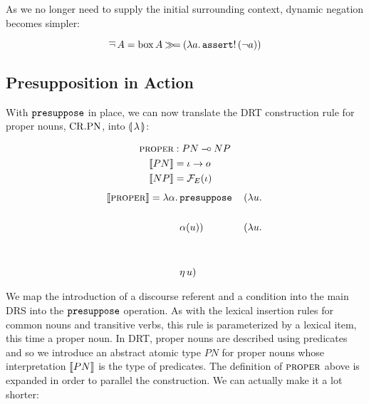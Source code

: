As we no longer need to supply the initial surrounding context, dynamic
negation becomes simpler:

$$
\mathop{\overline{\lnot}} A = \mathrm{box}\,A \mathbin{\gg\!=} (\lambda a.\, \mathtt{assert}!\,(\lnot a))
$$


\subsection{Presupposition in Action}
\label{ssec:presupposition-in-action}

With $\mathtt{presuppose}$ in place, we can now translate the DRT construction
rule for proper nouns, $\mathrm{CR.PN}$, into $\llparenthesis \, \lambda \, \rrparenthesis$:

\vspace{6mm}

\hspace{-1cm}
\begin{minipage}{0.69\textwidth}
\crpnbox
\end{minipage}
\begin{minipage}{0.31\textwidth}
\vspace{-4mm}
\begin{align*}
\textsc{proper} &: PN \mathbin{{-}\mkern-3.5mu{\circ}} NP \\
\llbracket PN \rrbracket &= \iota \to o \\
\llbracket NP \rrbracket &= \mathcal{F}_E(\iota)
\end{align*}
\vspace{2mm}
\begin{align*}
  \llbracket \textsc{proper} \rrbracket =
  \lambda \alpha.\, &\mathtt{presuppose}\,&(\lambda u.\,  \\
               \\
               &\alpha(u))\,&(\lambda u.\,  \\
               \\ \\
               & \eta\,u)
\end{align*}
\end{minipage}

\vspace{6mm}

We map the introduction of a discourse referent and a condition into the
main DRS into the $\mathtt{presuppose}$ operation. As with the lexical
insertion rules for common nouns and transitive verbs, this rule is
parameterized by a lexical item, this time a proper noun. In DRT, proper
nouns are described using predicates and so we introduce an abstract atomic
type $PN$ for proper nouns whose interpretation $\llbracket PN \rrbracket$ is the type of
predicates. The definition of $\textsc{proper}$ above is expanded in order to
parallel the construction. We can actually make it a lot shorter:

